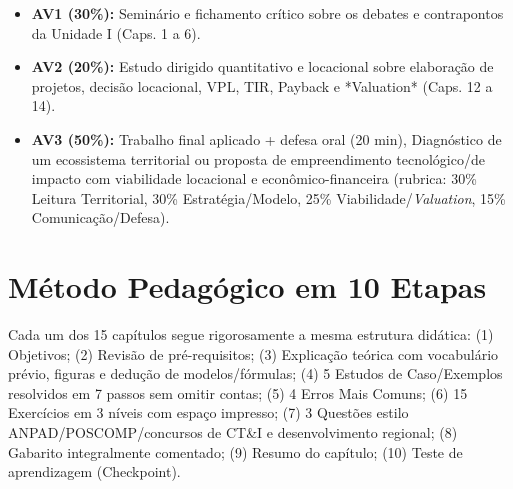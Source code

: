 \begin{itemize}[leftmargin=1.5em, itemsep=3pt]
  \item \textbf{AV1 (30\%):} Seminário e fichamento crítico sobre os debates e contrapontos da Unidade I (Caps. 1 a 6).
  \item \textbf{AV2 (20\%):} Estudo dirigido quantitativo e locacional sobre elaboração de projetos, decisão locacional, VPL, TIR, Payback e *Valuation* (Caps. 12 a 14).
  \item \textbf{AV3 (50\%):} Trabalho final aplicado + defesa oral (20 min), Diagnóstico de um ecossistema territorial ou proposta de empreendimento tecnológico/de impacto com viabilidade locacional e econômico-financeira (rubrica: 30\% Leitura Territorial, 30\% Estratégia/Modelo, 25\% Viabilidade/\textit{Valuation}, 15\% Comunicação/Defesa).
\end{itemize}

\section*{Método Pedagógico em 10 Etapas}

Cada um dos 15 capítulos segue rigorosamente a mesma estrutura didática: (1) Objetivos; (2) Revisão de pré-requisitos; (3) Explicação teórica com vocabulário prévio, figuras e dedução de modelos/fórmulas; (4) 5 Estudos de Caso/Exemplos resolvidos em 7 passos sem omitir contas; (5) 4 Erros Mais Comuns; (6) 15 Exercícios em 3 níveis com espaço impresso; (7) 3 Questões estilo ANPAD/POSCOMP/concursos de CT\&I e desenvolvimento regional; (8) Gabarito integralmente comentado; (9) Resumo do capítulo; (10) Teste de aprendizagem (Checkpoint).
